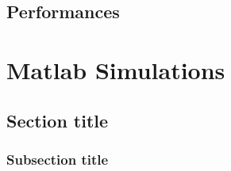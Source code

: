 \documentclass[a4paper,11pt,oneside]{book}
\begin{document}
\section{Performances}






\chapter{Matlab Simulations}

\section{Section title}
\subsection {Subsection title}







{}

\end{document}

